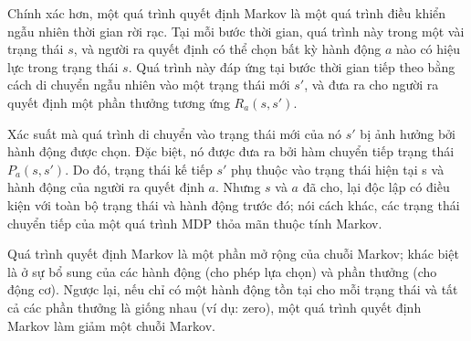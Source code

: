 \documentclass[14pt,a4paper,oneside]{report}		%
\begin{document}
Chính xác hơn, một quá trình quyết định Markov là một quá trình điều khiển ngẫu nhiên thời gian rời rạc. Tại mỗi bước thời gian, quá trình này trong một vài trạng thái $s$, và người ra quyết định có thể chọn bất kỳ hành động $a$ nào có hiệu lực trong trạng thái $s$. Quá trình này đáp ứng tại bước thời gian tiếp theo bằng cách di chuyển ngẫu nhiên vào một trạng thái mới $s'$, và đưa ra cho người ra quyết định một phần thưởng tương ứng $R_a(s,s')$.

Xác suất mà quá trình di chuyển vào trạng thái mới của nó $s'$ bị ảnh hưởng bởi hành động được chọn. Đặc biệt, nó được đưa ra bởi hàm chuyển tiếp trạng thái $P_a(s,s')$. Do đó, trạng thái kế tiếp $s'$ phụ thuộc vào trạng thái hiện tại s và hành động của người ra quyết định $a$. Nhưng $s$ và $a$ đã cho, lại độc lập có điều kiện với toàn bộ trạng thái và hành động trước đó; nói cách khác, các trạng thái chuyển tiếp của một quá trình MDP thỏa mãn thuộc tính Markov.

Quá trình quyết định Markov là một phần mở rộng của chuỗi Markov; khác biệt là ở sự bổ sung của các hành động (cho phép lựa chọn) và phần thưởng (cho động cơ). Ngược lại, nếu chỉ có một hành động tồn tại cho mỗi trạng thái và tất cả các phần thưởng là giống nhau (ví dụ: zero), một quá trình quyết định Markov làm giảm một chuỗi Markov.
\end{document}
